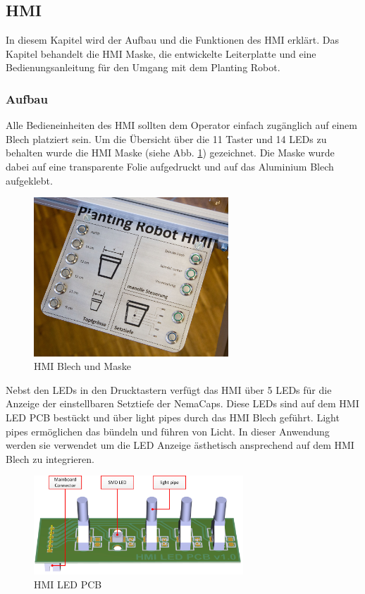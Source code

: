 \subsection{HMI} \label{sec:HMI}
In diesem Kapitel wird der Aufbau und die Funktionen des HMI erklärt. Das Kapitel behandelt die HMI Maske, die entwickelte Leiterplatte und eine Bedienungsanleitung für den Umgang mit dem Planting Robot.

\subsubsection{Aufbau}
Alle Bedieneinheiten des HMI sollten dem Operator einfach zugänglich auf einem Blech platziert sein. Um die Übersicht über die 11 Taster und 14 LEDs zu behalten wurde die HMI Maske (siehe Abb. \ref{fig:HMI_Maske}) gezeichnet. Die Maske wurde dabei auf eine transparente Folie aufgedruckt und auf das Aluminium Blech aufgeklebt.

\begin{figure}[H]
	\includegraphics[draft=false,width=0.65\textwidth]{Illustrationen/6-Umsetzung/HMI_Foto.jpg}
	\caption{HMI Blech und Maske}
	\label{fig:HMI_Maske}
\end{figure}

Nebst den LEDs in den Drucktastern verfügt das HMI über 5 LEDs für die Anzeige der einstellbaren Setztiefe der NemaCaps. Diese LEDs sind auf dem HMI LED PCB bestückt und über light pipes durch das HMI Blech geführt. Light pipes ermöglichen das bündeln und führen von Licht. In dieser Anwendung werden sie verwendet um die LED Anzeige ästhetisch ansprechend auf dem HMI Blech zu integrieren.

\begin{figure}[H]
	\includegraphics[draft=false,width=0.7\textwidth]{Illustrationen/6-Umsetzung/LED_PCB_3D.jpg}
	\caption{HMI LED PCB}
	\label{fig:LED_PCB_1}
\end{figure}

